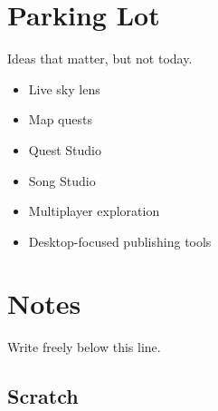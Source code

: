 \documentclass[11pt]{article}
\begin{document}
\section{Parking Lot}
\label{sec:org6978b49}

Ideas that matter, but not today.

\begin{itemize}
\item Live sky lens
\item Map quests
\item Quest Studio
\item Song Studio
\item Multiplayer exploration
\item Desktop-focused publishing tools
\end{itemize}
\section{Notes}
\label{sec:org5179f0c}

Write freely below this line.
\subsection{Scratch}
\label{sec:orgd4b328f}
\end{document}
